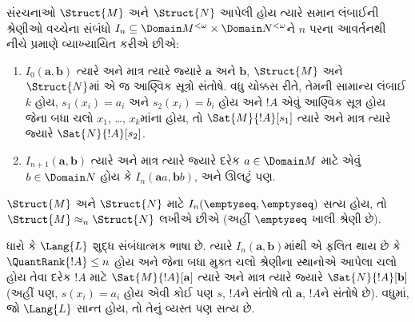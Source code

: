 \begin{defn}
  સંરચનાઓ $\Struct{M}$ અને $\Struct{N}$ આપેલી હોય ત્યારે સમાન
  લંબાઈની શ્રેણીઓ વચ્ચેના સંબંધો $I_n \subseteq \Domain M^{<\omega}
  \times \Domain N^{<\omega}$ને $n$ પરના આવર્તનથી નીચે પ્રમાણે
  વ્યાખ્યાયિત કરીએ છીએ:
   \begin{enumerate}
   \item $I_0(\mathbf{a},\mathbf{b})$ ત્યારે અને માત્ર ત્યારે જ્યારે
     $\mathbf{a}$ અને $\mathbf{b}$, $\Struct{M}$ અને $\Struct{N}$માં
     એ જ આણ્વિક સૂત્રો સંતોષે. વધુ ચોક્કસ રીતે, તેમની સામાન્ય
     લંબાઈ $k$ હોય, $s_1(x_i) = a_i$ અને $s_2(x_i) = b_i$ હોય અને
     $!A$ એવું આણ્વિક સૂત્ર હોય જેના બધા ચલો $x_1$, \dots,
     $x_k$માંના હોય, તો $\Sat{M}{!A}[s_1]$ ત્યારે અને માત્ર ત્યારે જ્યારે
     $\Sat{N}{!A}[s_2]$.
   \item $I_{n+1} (\mathbf{a},\mathbf{b})$ ત્યારે અને માત્ર ત્યારે
     જ્યારે દરેક $a\in \Domain M$ માટે એવું $b\in \Domain N$ હોય કે
     $I_n(\mathbf{a}a,\mathbf{b}b)$, અને ઊલટું પણ.
   \end{enumerate}
\end{defn}


\begin{defn}
  $\Struct{M}$ અને $\Struct{N}$ માટે
  $I_n(\emptyseq,\emptyseq)$ સત્ય હોય, તો $\Struct{M} \approx_n
  \Struct{N}$ લખીએ છીએ (અહીં $\emptyseq$ ખાલી શ્રેણી છે).
\end{defn}

\begin{thm}
  ધારો કે $\Lang{L}$ શુદ્ધ સંબંધાત્મક ભાષા છે. ત્યારે
  $I_n(\mathbf{a},\mathbf{b})$માંથી એ ફલિત થાય છે કે
  $\QuantRank{!A} \le n$ હોય અને જેના બધા મુક્ત ચલો શ્રેણીના સ્થાનોએ
  આપેલા ચલો હોય તેવા દરેક $!A$ માટે
  $\Sat{M}{!A}[\mathbf{a}]$ ત્યારે અને માત્ર ત્યારે જ્યારે
  $\Sat{N}{!A}[\mathbf{b}]$ (અહીં પણ, $s(x_i) = a_i$ હોય એવી કોઈ પણ
  $s$, $!A$ને સંતોષે તો $\mathbf{a}$, $!A$ને સંતોષે છે). વધુમાં, જો
  $\Lang{L}$ સાન્ત હોય, તો તેનું વ્યસ્ત પણ સત્ય છે.
\end{thm}

